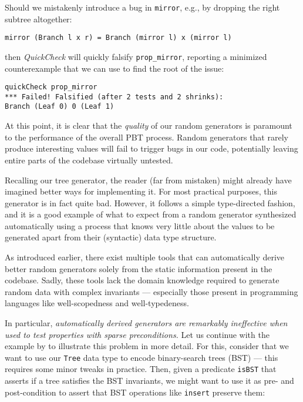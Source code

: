 \documentclass[sigconf, anonymous]{acmart}
\newcommand{\quickcheck}{\textit{QuickCheck}\xspace}
\begin{document}
\noindent Should we mistakenly introduce a bug in \texttt{mirror}, e.g., by
dropping the right subtree altogether:

\begin{verbatim}
mirror (Branch l x r) = Branch (mirror l) x (mirror l)
\end{verbatim}

\noindent then \quickcheck will quickly falsify \texttt{prop\_mirror}, reporting
a minimized counterexample that we can use to find the root of the issue:

\begin{verbatim}
quickCheck prop_mirror
*** Failed! Falsified (after 2 tests and 2 shrinks):
Branch (Leaf 0) 0 (Leaf 1)
\end{verbatim}

At this point, it is clear that the \emph{quality} of our random generators is
paramount to the performance of the overall PBT process.
%
Random generators that rarely produce interesting values will fail to trigger
bugs in our code, potentially leaving entire parts of the codebase virtually
untested.


Recalling our tree generator, the reader (far from mistaken) might already have
imagined better ways for implementing it.
%
For most practical purposes, this generator is in fact quite bad.
%
However, it follows a simple type-directed fashion, and it is a good example of
what to expect from a random generator synthesized automatically using a process
that knows very little about the values to be generated apart from their
(syntactic) data type structure.

As introduced earlier, there exist multiple tools that can automatically derive
better random generators solely from the static information present in the
codebase.
%
%
Sadly, these tools lack the domain knowledge required to generate random data
with complex invariants --- especially those present in programming languages
like well-scopedness and well-typedeness.


In particular, \emph{automatically derived generators are remarkably ineffective
  when used to test properties with sparse preconditions.}
%
Let us continue with the example by \citeauthor{lampropoulos2019coverage} to
illustrate this problem in more detail.
%
For this, consider that we want to use our \texttt{Tree} data type to encode
binary-search trees (BST) --- this requires some minor tweaks in practice.
%
Then, given a predicate \texttt{isBST} that asserts if a tree satisfies the BST
invariants, we might want to use it as pre- and post-condition to assert that
BST operations like \texttt{insert} preserve them:
\end{document}

